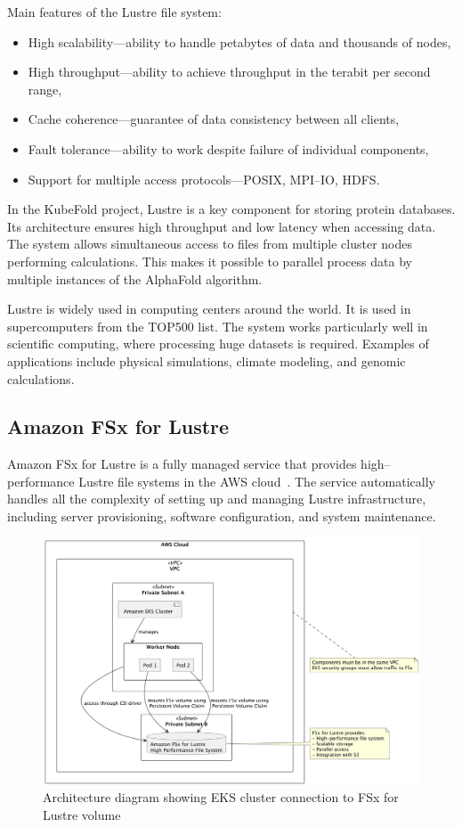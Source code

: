 Main features of the Lustre file system:
\begin{itemize}
    \item High scalability—ability to handle petabytes of data and thousands of nodes,
    \item High throughput—ability to achieve throughput in the terabit per second range,
    \item Cache coherence—guarantee of data consistency between all clients,
    \item Fault tolerance—ability to work despite failure of individual components,
    \item Support for multiple access protocols—POSIX, MPI--IO, HDFS\@.
\end{itemize}

In the KubeFold project, Lustre is a key component for storing protein databases.
Its architecture ensures high throughput and low latency when accessing data.
The system allows simultaneous access to files from multiple cluster nodes performing calculations.
This makes it possible to parallel process data by multiple instances of the AlphaFold algorithm.

Lustre is widely used in computing centers around the world.
It is used in supercomputers from the TOP500 list.
The system works particularly well in scientific computing, where processing huge datasets is required.
Examples of applications include physical simulations, climate modeling, and genomic calculations.

\subsection{Amazon FSx for Lustre}\label{subsec:amazon-fsx-for-lustre}

Amazon FSx for Lustre is a fully managed service that provides high--performance Lustre file systems in the AWS cloud~\cite{aws_fsx}.
The service automatically handles all the complexity of setting up and managing Lustre infrastructure, including server provisioning, software configuration, and system maintenance.

\begin{figure}[htbp]
    \centering
    \includegraphics[width=\textwidth]{images/fsx}
    \caption{Architecture diagram showing EKS cluster connection to FSx for Lustre volume}
    \label{fig:fsx-architecture}
\end{figure}

